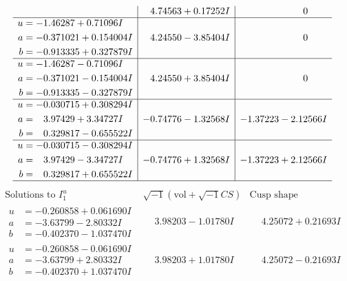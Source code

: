 \documentclass[1p]{elsarticle_modified}
\theoremstyle{definition}
\newcommand{\I}{\sqrt{-1}}
\begin{document}
$$\begin{array}{c|c|c}
 & \phantom{-}4.74563 + 0.17252 I & \phantom{-0.000000 } 0 \\ \hline\begin{aligned}
u &= -1.46287 + 0.71096 I \\
a &= -0.371021 + 0.154004 I \\
b &= -0.913335 + 0.327879 I\end{aligned}
 & \phantom{-}4.24550 - 3.85404 I & \phantom{-0.000000 } 0 \\ \hline\begin{aligned}
u &= -1.46287 - 0.71096 I \\
a &= -0.371021 - 0.154004 I \\
b &= -0.913335 - 0.327879 I\end{aligned}
 & \phantom{-}4.24550 + 3.85404 I & \phantom{-0.000000 } 0 \\ \hline\begin{aligned}
u &= -0.030715 + 0.308294 I \\
a &= \phantom{-}3.97429 + 3.34727 I \\
b &= \phantom{-}0.329817 - 0.655522 I\end{aligned}
 & -0.74776 - 1.32568 I & -1.37223 - 2.12566 I \\ \hline\begin{aligned}
u &= -0.030715 - 0.308294 I \\
a &= \phantom{-}3.97429 - 3.34727 I \\
b &= \phantom{-}0.329817 + 0.655522 I\end{aligned}
 & -0.74776 + 1.32568 I & -1.37223 + 2.12566 I\\
 \hline 
 \end{array}$$\newpage$$\begin{array}{c|c|c}  
\text{Solutions to }I^u_{1}& \I (\text{vol} + \sqrt{-1}CS) & \text{Cusp shape}\\
 \hline 
\begin{aligned}
u &= -0.260858 + 0.061690 I \\
a &= -3.63799 - 2.80332 I \\
b &= -0.402370 - 1.037470 I\end{aligned}
 & \phantom{-}3.98203 - 1.01780 I & \phantom{-}4.25072 + 0.21693 I \\ \hline\begin{aligned}
u &= -0.260858 - 0.061690 I \\
a &= -3.63799 + 2.80332 I \\
b &= -0.402370 + 1.037470 I\end{aligned}
 & \phantom{-}3.98203 + 1.01780 I & \phantom{-}4.25072 - 0.21693 I \\ \hline\begin{aligned}

\end{aligned}
\end{array}$$
\end{document}
